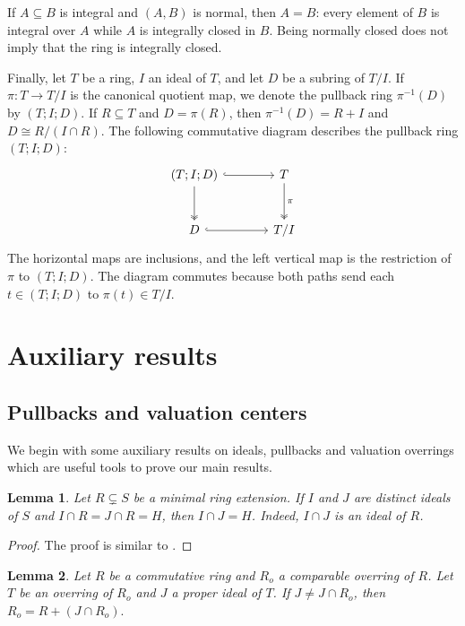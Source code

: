 \documentclass[12pt]{article}
\newtheorem{lemma}{Lemma}
\begin{document}
	If $A\subseteq B$ is integral and $(A,B)$ is normal, then $A=B$: every element of $B$ is integral over $A$ while $A$ is integrally closed in $B$. Being normally closed does not imply that the ring is integrally closed.

    Finally, let $T$ be a ring, $I$ an ideal of $T$, and let $D$ be a subring of $T/I$. If $\pi:T\longrightarrow T/I$ is the canonical quotient map, we denote the pullback ring $\pi^{-1}(D)$ by $(T;I;D)$. If $R\subseteq T$ and $D=\pi(R)$, then $\pi^{-1}(D)=R+I$ and $D\cong R/(I\cap R)$. The following commutative diagram describes the pullback ring $(T;I;D)$:
    \[
    \begin{tikzcd}[column sep=large, row sep=large]
    	(T;I;D) \arrow[r, hook] \arrow[d, two heads] & T \arrow[d, two heads, "\pi"] \\
    	D \arrow[r, hook] & T/I
    \end{tikzcd}
    \]
    The horizontal maps are inclusions, and the left vertical map is the restriction of $\pi$ to $(T;I;D)$. The diagram commutes because both paths send each $t\in(T;I;D)$ to $\pi(t)\in T/I$.

	\section{Auxiliary results}\label{sec-auxiliary}
	\subsection{Pullbacks and valuation centers}
	We begin with some auxiliary results on ideals, pullbacks and valuation overrings which are useful tools to prove our main results.
	\begin{lemma}\label{minimal-ideals}
		Let $R\subsetneq S$ be a minimal ring extension. If $I$ and $J$ are distinct ideals of $S$ and $I\cap R=J\cap R=H$, then $I\cap J=H$. Indeed, $I\cap J$ is an ideal of $R$.
	\end{lemma}
	\begin{proof}
		The proof is similar to \cite[Lemma 2.1]{gilmer-heinzer}.
	\end{proof}
	\begin{lemma}\label{comparable-ideal}
		Let $R$ be a commutative ring and $R_o$ a comparable overring of $R$. Let $T$ be an overring of $R_o$ and $J$ a proper ideal of $T$. If $J\neq J\cap R_o$, then $R_o=R+(J\cap R_o).$
	\end{lemma}
	
\end{document}
